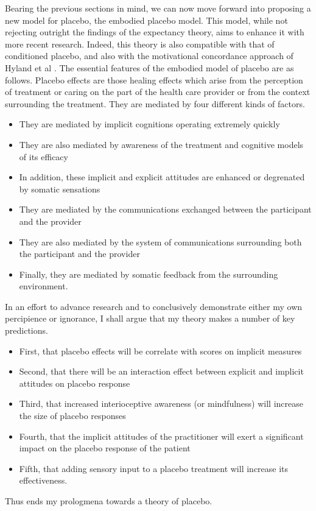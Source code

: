 Bearing the previous sections in mind, we can now move forward into proposing a new model for placebo, the embodied placebo model. This model, while not rejecting outright the findings of the expectancy theory, aims to enhance it with more recent research. Indeed, this theory is also compatible with that of conditioned placebo, and also with the motivational concordance approach of Hyland et al \cite{Hyland2007}.  
The essential features of the embodied model of placebo are as follows. Placebo effects are those healing effects which arise from the perception of treatment or caring on the part of the health care provider or from the context surrounding the treatment. They are mediated by four different kinds of factors.
\begin{itemize}
\item They are mediated by implicit cognitions operating extremely quickly
\item They are also mediated by awareness of the treatment and cognitive models of its efficacy
\item In addition, these implicit and explicit attitudes are enhanced or degrenated by somatic sensations
\item They are mediated by the communications exchanged between the participant and the provider
\item They are also mediated by the system of communications surrounding both the participant and the provider
\item Finally, they are mediated by somatic feedback from the surrounding environment.
\end{itemize}
 
In an effort to advance research and to conclusively demonstrate either my own percipience or ignorance, I shall argue that my theory makes a number of key predictions. 

\begin{itemize}
\item First, that placebo effects will be correlate with scores on implicit measures
\item Second, that there will be an interaction effect between explicit and implicit attitudes on placebo response
\item Third, that increased interioceptive awareness (or mindfulness) will increase the size of placebo responses
\item Fourth, that the implicit attitudes of the practitioner will exert a significant impact on the placebo response of the patient
\item Fifth, that adding sensory input to a placebo treatment will increase its effectiveness. 
\end{itemize}

Thus ends my prologmena towards a theory of placebo.


